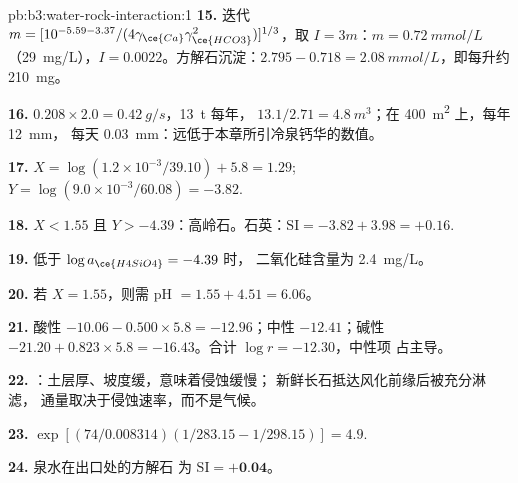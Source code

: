 \begin{solution}{pb:b3:water-rock-interaction:1}
\textbf{15.} 迭代 $m = [10^{-5.59 - 3.37}/(4\gamma_{\ce{Ca}}
\gamma_{\ce{HCO3}}^2)]^{1/3}$，取 $I = 3m$：$m = \qty{0.72}{mmol/L}$
（\qty{29}{mg/L}），$I = 0.0022$。方解石沉淀：$2.795 - 0.718 =
\qty{2.08}{mmol/L}$，即每升约 \qty{210}{mg}。

\textbf{16.} $0.208\times2.0 = \qty{0.42}{g/s}$，\qty{13}{t} 每年，
$13.1/2.71 = \qty{4.8}{m^3}$；在 \qty{400}{m^2} 上，每年 \qty{12}{mm}，
每天 \qty{0.03}{mm}：远低于本章所引冷泉钙华的数值。

\textbf{17.} $X = \log(1.2\times10^{-3}/39.10) + 5.8 = 1.29$; $Y =
\log(9.0\times10^{-3}/60.08) = -3.82$.

\textbf{18.} $X < 1.55$ 且 $Y > -4.39$：高岭石。石英：$\mathrm{SI} =
-3.82 + 3.98 = +0.16$.

\textbf{19.} 低于 $\log a_{\ce{H4SiO4}} = -4.39$ 时，
二氧化硅含量为 \qty{2.4}{mg/L}。

\textbf{20.} 若 $X = 1.55$，则需 pH $= 1.55 + 4.51 = 6.06$。

\textbf{21.} 酸性 $-10.06 - 0.500\times5.8 = -12.96$；中性 $-12.41$；碱性
$-21.20 + 0.823\times5.8 = -16.43$。合计 $\log r = -12.30$，中性项
占主导。

\textbf{22.} ：土层厚、坡度缓，意味着侵蚀缓慢；
新鲜长石抵达风化前缘后被充分淋滤，
通量取决于侵蚀速率，而不是气候。

\textbf{23.} $\exp[(74/0.008314)(1/283.15 - 1/298.15)] = 4.9$.

\textbf{24.} 泉水在出口处的方解石
为 $\mathrm{SI} = \textbf{+0.04}$。
\end{solution}
